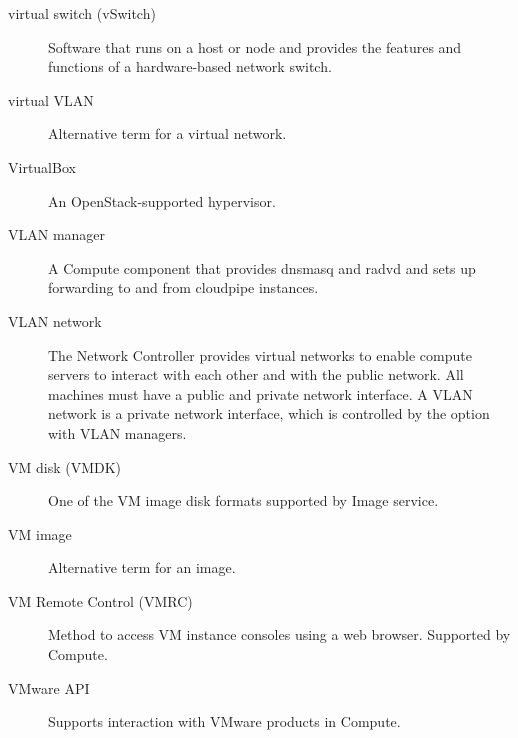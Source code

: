 \documentclass[letterpaper,10pt,english]{sphinxmanual}
\begin{document}
\begin{description}
\item[{virtual switch (vSwitch)}] \leavevmode{}\label{_source/glossary:term-virtual-switch-vswitch}
Software that runs on a host or node and provides the features
and functions of a hardware-based network switch.

\item[{virtual VLAN}] \leavevmode{}\label{_source/glossary:term-virtual-vlan}
Alternative term for a virtual network.

\item[{VirtualBox}] \leavevmode{}\label{_source/glossary:term-virtualbox}
An OpenStack-supported hypervisor.

\item[{VLAN manager}] \leavevmode{}\label{_source/glossary:term-vlan-manager}
A Compute component that provides dnsmasq and radvd and sets up
forwarding to and from cloudpipe instances.

\item[{VLAN network}] \leavevmode{}\label{_source/glossary:term-vlan-network}
The Network Controller provides virtual networks to enable
compute servers to interact with each other and with the public
network. All machines must have a public and private network
interface. A VLAN network is a private network interface, which is
controlled by the  option with VLAN
managers.

\item[{VM disk (VMDK)}] \leavevmode{}\label{_source/glossary:term-vm-disk-vmdk}
One of the VM image disk formats supported by Image
service.

\item[{VM image}] \leavevmode{}\label{_source/glossary:term-vm-image}
Alternative term for an image.

\item[{VM Remote Control (VMRC)}] \leavevmode{}\label{_source/glossary:term-vm-remote-control-vmrc}
Method to access VM instance consoles using a web browser.
Supported by Compute.

\item[{VMware API}] \leavevmode{}\label{_source/glossary:term-vmware-api}
Supports interaction with VMware products in Compute.


\end{description}
\end{document}

